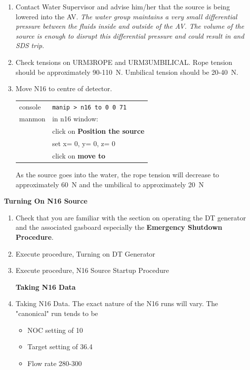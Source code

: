 \begin{enumerate}
\item \CheckBox[name=n16c1]{} Contact Water Supervisor and advise him/her that the source is being lowered into the AV. {\it The water group maintains a very small differential pressure between the fluids inside and outside of the AV. The volume of the source is enough to disrupt this differential pressure and could result in and SDS trip.}
\item \CheckBox[name=n16c2]{} Check tensions on URM3ROPE and URM3UMBILICAL. Rope tension should be approximately 90-110~N. Umbilical tension should be 20-40~N.
\item \CheckBox[name=n16c3]{} Move N16 to centre of detector.
	\begin{center}
	\begin{tabular}{|l|l|}
	\hline
	console & \verb+manip > n16 to 0 0 71+ \\
	manmon & in n16 window: \\
	& click on {\bf Position the source} \\
	& set x= 0, y= 0, z= 0 \\
	& click on {\bf move to} \\
	\hline
	\end{tabular}
	\end{center}
As the source goes into the water, the rope tension will decrease to approximately 60~N and the umbilical to approximately 20~N
\end{enumerate}

{\bf Turning On N16 Source}

\begin{enumerate}
\item \CheckBox[name=n16t1]{} Check that you are familiar with the section on operating the DT generator and the associated gasboard especially the {\bf Emergency Shutdown Procedure}.
\item \CheckBox[name=n16t2]{} Execute procedure, Turning on DT Generator
\item \CheckBox[name=n16t3]{} Execute procedure, N16 Source Startup Procedure

{\bf Taking N16 Data}

\item \CheckBox[name=n16t4]{} Taking N16 Data. The exact nature of the N16 runs will vary. The "canonical" run tends to be 
\begin{itemize}
\item NOC setting of 10
\item Target setting of 36.4
\item Flow rate 280-300
\end{itemize}
\end{enumerate}

